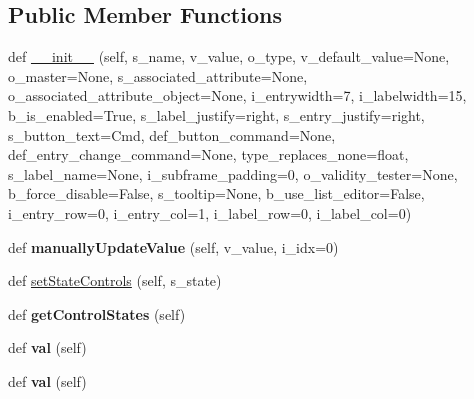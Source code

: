 \subsection*{Public Member Functions}
\begin{DoxyCompactItemize}
\item 
def \hyperlink{classnegui_1_1pgkeyvalueframe_1_1KeyValFrame_a8c2ff5749913d769fe35bb0022d92321}{\+\_\+\+\_\+init\+\_\+\+\_\+} (self, s\+\_\+name, v\+\_\+value, o\+\_\+type, v\+\_\+default\+\_\+value=None, o\+\_\+master=None, s\+\_\+associated\+\_\+attribute=None, o\+\_\+associated\+\_\+attribute\+\_\+object=None, i\+\_\+entrywidth=7, i\+\_\+labelwidth=15, b\+\_\+is\+\_\+enabled=True, s\+\_\+label\+\_\+justify=\textquotesingle{}right\textquotesingle{}, s\+\_\+entry\+\_\+justify=\textquotesingle{}right\textquotesingle{}, s\+\_\+button\+\_\+text=\textquotesingle{}Cmd\textquotesingle{}, def\+\_\+button\+\_\+command=None, def\+\_\+entry\+\_\+change\+\_\+command=None, type\+\_\+replaces\+\_\+none=float, s\+\_\+label\+\_\+name=None, i\+\_\+subframe\+\_\+padding=0, o\+\_\+validity\+\_\+tester=None, b\+\_\+force\+\_\+disable=False, s\+\_\+tooltip=None, b\+\_\+use\+\_\+list\+\_\+editor=False, i\+\_\+entry\+\_\+row=0, i\+\_\+entry\+\_\+col=1, i\+\_\+label\+\_\+row=0, i\+\_\+label\+\_\+col=0)
\item 
def {\bfseries manually\+Update\+Value} (self, v\+\_\+value, i\+\_\+idx=0)\hypertarget{classnegui_1_1pgkeyvalueframe_1_1KeyValFrame_a59b56809197ca8e3930e1ea07953d953}{}\label{classnegui_1_1pgkeyvalueframe_1_1KeyValFrame_a59b56809197ca8e3930e1ea07953d953}

\item 
def \hyperlink{classnegui_1_1pgkeyvalueframe_1_1KeyValFrame_adcbafb75f2a411d6a10c1c4248395e02}{set\+State\+Controls} (self, s\+\_\+state)
\item 
def {\bfseries get\+Control\+States} (self)\hypertarget{classnegui_1_1pgkeyvalueframe_1_1KeyValFrame_a94977d29ae8033de0d6c5dfdd2efd39c}{}\label{classnegui_1_1pgkeyvalueframe_1_1KeyValFrame_a94977d29ae8033de0d6c5dfdd2efd39c}

\item 
def {\bfseries val} (self)\hypertarget{classnegui_1_1pgkeyvalueframe_1_1KeyValFrame_a9417797618926333757e68767bb74233}{}\label{classnegui_1_1pgkeyvalueframe_1_1KeyValFrame_a9417797618926333757e68767bb74233}

\item 
def {\bfseries val} (self)\hypertarget{classnegui_1_1pgkeyvalueframe_1_1KeyValFrame_a9417797618926333757e68767bb74233}{}\label{classnegui_1_1pgkeyvalueframe_1_1KeyValFrame_a9417797618926333757e68767bb74233}


\end{DoxyCompactItemize}
